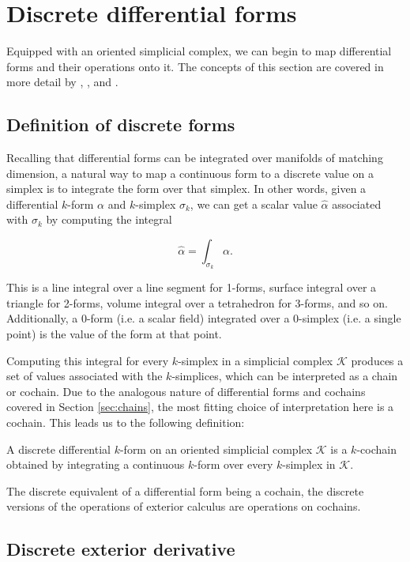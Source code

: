 \documentclass[utf8,english]{gradu3}
\begin{document}
\section{Discrete differential forms}

Equipped with an oriented simplicial complex,
we can begin to map differential forms and their operations onto it.
The concepts of this section are covered in more detail by \textcite{desbrun_discrete_2006},
\textcite{crane_digital_2013}, and \textcite{blair_perot_differential_2014}.


\subsection{Definition of discrete forms}\label{sec:discrete_forms}

Recalling that differential forms can be integrated
over manifolds of matching dimension,
a natural way to map a continuous form to a discrete value on a simplex
is to integrate the form over that simplex.
In other words, given a differential $k$-form $\alpha$
and $k$-simplex $\sigma_k$, we can get a scalar value $\widehat{\alpha}$
associated with $\sigma_k$ by computing the integral

\[
  \widehat{\alpha} = \int_{\sigma_k} \alpha.
\]

This is a line integral over a line segment for 1-forms,
surface integral over a triangle for 2-forms,
volume integral over a tetrahedron for 3-forms, and so on.
Additionally, a 0-form (i.e. a scalar field)
integrated over a 0-simplex (i.e. a single point)
is the value of the form at that point.

Computing this integral for every $k$-simplex in a simplicial complex $\mathcal{K}$
produces a set of values associated with the $k$-simplices,
which can be interpreted as a chain or cochain.
Due to the analogous nature of differential forms and cochains
covered in Section \ref{sec:chains},
the most fitting choice of interpretation here is a cochain.
This leads us to the following definition:

A discrete differential $k$-form on an oriented simplicial complex $\mathcal{K}$
is a $k$-cochain obtained by integrating a continuous $k$-form
over every $k$-simplex in $\mathcal{K}$.

The discrete equivalent of a differential form being a cochain,
the discrete versions of the operations of exterior calculus
are operations on cochains.


\subsection{Discrete exterior derivative}\label{sec:disc_ext_der}
\end{document}
